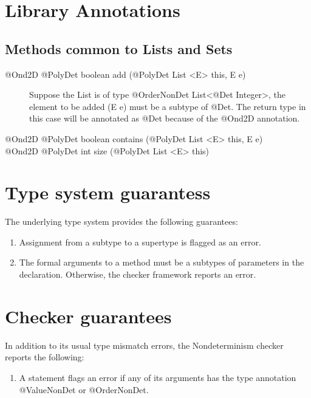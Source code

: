 \section{Library Annotations\label{nondeterminism-library-annotations}}
\subsection{Methods common to Lists and Sets\label{lib-methods}}
\begin{description}
  \item[@Ond2D @PolyDet  boolean add (@PolyDet List <E> this, E e)] Suppose the List is of
  type @OrderNonDet List<@Det Integer>, the element to be added (E e) must be a subtype of @Det.
  The return type in this case will be annotated as @Det because of the @Ond2D annotation.
  \item[@Ond2D @PolyDet  boolean contains (@PolyDet List <E> this, E e)]
  \item[@Ond2D @PolyDet int size (@PolyDet List <E> this)]
\end{description}

\section{Type system guarantess\label{nondeterminism-type-system-guarantees}}
The underlying type system provides the following guarantees:
\begin{enumerate}
  \item Assignment from a subtype to a supertype is flagged as an error.
  \item The formal arguments to a method must be a subtypes of parameters in the declaration. Otherwise, the checker framework reports an error.
\end{enumerate}

\section{Checker guarantees\label{nondeterminism-error-reporting}}
In addition to its usual type mismatch errors, the Nondeterminism checker reports the following:
\begin{enumerate}
  \item A  statement flags an error if any of its arguments has the type annotation @ValueNonDet or @OrderNonDet.
\end{enumerate}

